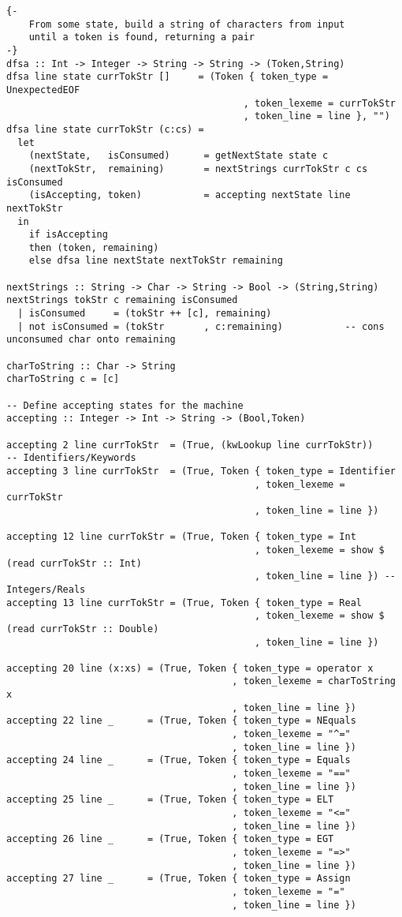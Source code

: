 \documentclass[11pt]{article}
\begin{document}
\begin{verbatim}
{-
    From some state, build a string of characters from input
    until a token is found, returning a pair
-}
dfsa :: Int -> Integer -> String -> String -> (Token,String)
dfsa line state currTokStr []     = (Token { token_type = UnexpectedEOF
                                          , token_lexeme = currTokStr
                                          , token_line = line }, "")
dfsa line state currTokStr (c:cs) =
  let
    (nextState,   isConsumed)      = getNextState state c
    (nextTokStr,  remaining)       = nextStrings currTokStr c cs isConsumed
    (isAccepting, token)           = accepting nextState line nextTokStr
  in
    if isAccepting
    then (token, remaining)
    else dfsa line nextState nextTokStr remaining

nextStrings :: String -> Char -> String -> Bool -> (String,String)
nextStrings tokStr c remaining isConsumed
  | isConsumed     = (tokStr ++ [c], remaining)
  | not isConsumed = (tokStr       , c:remaining)           -- cons unconsumed char onto remaining

charToString :: Char -> String
charToString c = [c]

-- Define accepting states for the machine
accepting :: Integer -> Int -> String -> (Bool,Token)

accepting 2 line currTokStr  = (True, (kwLookup line currTokStr))       -- Identifiers/Keywords
accepting 3 line currTokStr  = (True, Token { token_type = Identifier
                                            , token_lexeme = currTokStr
                                            , token_line = line })

accepting 12 line currTokStr = (True, Token { token_type = Int
                                            , token_lexeme = show $ (read currTokStr :: Int)
                                            , token_line = line }) -- Integers/Reals
accepting 13 line currTokStr = (True, Token { token_type = Real
                                            , token_lexeme = show $ (read currTokStr :: Double)
                                            , token_line = line })

accepting 20 line (x:xs) = (True, Token { token_type = operator x
                                        , token_lexeme = charToString x
                                        , token_line = line })
accepting 22 line _      = (True, Token { token_type = NEquals
                                        , token_lexeme = "^="
                                        , token_line = line })
accepting 24 line _      = (True, Token { token_type = Equals
                                        , token_lexeme = "=="
                                        , token_line = line })
accepting 25 line _      = (True, Token { token_type = ELT
                                        , token_lexeme = "<="
                                        , token_line = line })
accepting 26 line _      = (True, Token { token_type = EGT
                                        , token_lexeme = "=>"
                                        , token_line = line })
accepting 27 line _      = (True, Token { token_type = Assign
                                        , token_lexeme = "="
                                        , token_line = line })


\end{verbatim}
\end{document}
